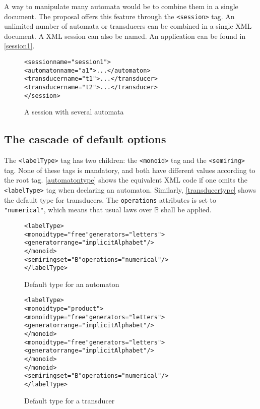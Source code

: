 \documentclass[a4paper]{article}
\newcommand{\xtag}[1]{\texttt{<#1>}}
\newcommand{\xattr}[1]{\texttt{#1}}
\def\typetag{\xtag{labelType}}
\def\sessiontag{\xtag{session}}
\def\monoidtag{\xtag{monoid}}
\def\semiringtag{\xtag{semiring}}
\begin{document}
A way to manipulate many automata would be to combine them in a single
document. The proposal offers this feature through the \sessiontag{}
tag. An unlimited number of automata or transducers can be combined in
a single XML document. A XML session can also be named.  An
application can be found in \autoref{session1}.

\begin{figure}[ht]
  \small
  \begin{center}
\begin{alltt}
<session name="session1">
  <automaton name="a1">...</automaton>
  <transducer name="t1">...</transducer>
  <transducer name="t2">...</transducer>
</session>
\end{alltt}

\caption{A session with several automata}
\label{session1}
  \end{center}
\end{figure}

\subsection{The cascade of default options}

The \typetag{} tag has two children: the \monoidtag{} tag and the
\semiringtag{} tag. None of these tags is mandatory, and both have
different values according to the root tag. \autoref{automatontype}
shows the equivalent XML code if one omits the \typetag{} tag when
declaring an automaton. Similarly, \autoref{transducertype} shows the
default type for transducers.  The \xattr{operations} attributes is
set to \verb|"numerical"|, which means that usual laws over
$\mathbb{B}$ shall be applied.

\begin{figure}[ht]
  \begin{center}
\begin{alltt}
<labelType>
  <monoid type="free" generators="letters">
     <generator range="implicitAlphabet"/>
  </monoid>
  <semiring set="B" operations="numerical"/>
</labelType>
\end{alltt}

\caption{Default type for an automaton}
\label{automatontype}
  \end{center}
\end{figure}


\begin{figure}[ht]
  \begin{center}
\begin{alltt}
<labelType>
  <monoid type="product">
     <monoid type="free" generators="letters">
       <generator range="implicitAlphabet"/>
     </monoid>
     <monoid type="free" generators="letters">
       <generator range="implicitAlphabet"/>
     </monoid>
  </monoid>
  <semiring set="B" operations="numerical"/>
</labelType>
\end{alltt}

\caption{Default type for a transducer}
\label{transducertype}
  \end{center}
\end{figure}
\end{document}
